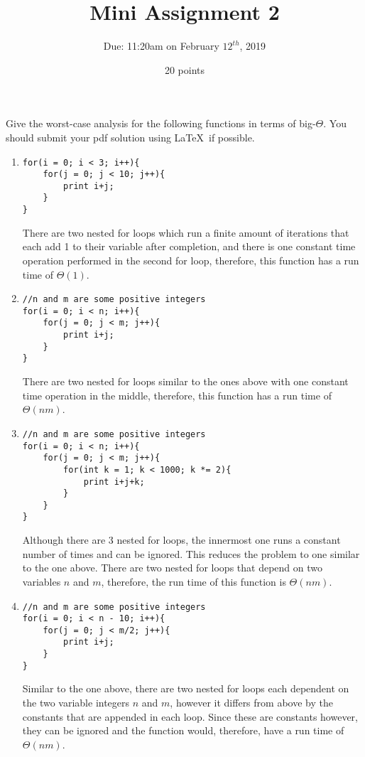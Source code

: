 \documentclass[12pt]{article}
\begin{document}
 
\title{Mini Assignment 2}
\author{Due: 11:20am on February $12^{th}$, 2019}
\date{20 points}
\maketitle

Give the worst-case analysis for the following functions in terms of big-$\Theta$. You should submit your pdf solution using \LaTeX\ if possible.
    \begin{enumerate}
    	\item 
\begin{lstlisting}
for(i = 0; i < 3; i++){
    for(j = 0; j < 10; j++){
        print i+j;
    }
}
\end{lstlisting}
There are two nested for loops which run a finite amount of iterations that each add 1 to their variable after completion, and there is one constant time operation performed in the second for loop, therefore, this function has a run time of $\boxed{\Theta(1)}$.
    	\item 
\begin{lstlisting}
//n and m are some positive integers
for(i = 0; i < n; i++){
    for(j = 0; j < m; j++){
        print i+j;
    }
}
\end{lstlisting}
There are two nested for loops similar to the ones above with one constant time operation in the middle, therefore, this function has a run time of $\boxed{\Theta(nm)}$.
\newpage
    	\item 
\begin{lstlisting}
//n and m are some positive integers
for(i = 0; i < n; i++){
    for(j = 0; j < m; j++){
        for(int k = 1; k < 1000; k *= 2){
        	print i+j+k;
        }
    }
}
\end{lstlisting}
Although there are 3 nested for loops, the innermost one runs a constant number of times and can be ignored. This reduces the problem to one similar to the one above. There are two nested for loops that depend on two variables $n$ and $m$, therefore, the run time of this function is $\boxed{\Theta(nm)}$.
    	\item 
\begin{lstlisting}
//n and m are some positive integers
for(i = 0; i < n - 10; i++){
    for(j = 0; j < m/2; j++){
        print i+j;
    }
}
\end{lstlisting}
Similar to the one above, there are two nested for loops each dependent on the two variable integers $n$ and $m$, however it differs from above by the constants that are appended in each loop. Since these are constants however, they can be ignored and the function would, therefore, have a run time of $\boxed{\Theta(nm)}$.

\end{enumerate}
\end{document}
